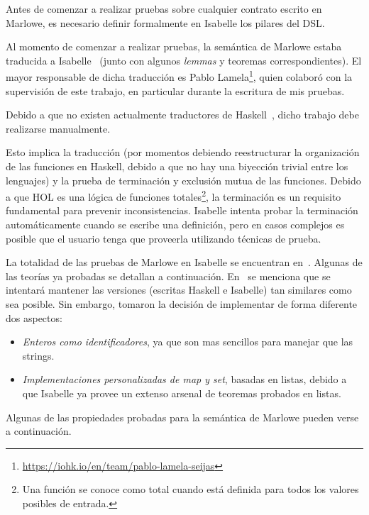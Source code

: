 \documentclass[12pt]{book}
\begin{document}
Antes de comenzar a realizar pruebas sobre cualquier contrato escrito en Marlowe, es necesario definir formalmente en Isabelle los pilares del DSL.\@

Al momento de comenzar a realizar pruebas, la semántica de Marlowe estaba traducida a Isabelle~\cite{implementing_financial_contracts_on_blockchain, efficient-static-analysis-marlowe-isabelle} (junto con algunos \textit{lemmas} y teoremas correspondientes). El mayor responsable de dicha traducción es Pablo Lamela\footnote{\url{https://iohk.io/en/team/pablo-lamela-seijas}}, quien colaboró con la supervisión de este trabajo, en particular durante la escritura de mis pruebas.

Debido a que no existen actualmente traductores de Haskell~\cite{translating-haskell-to-isabelle}, dicho trabajo debe realizarse manualmente. 

Esto implica la traducción (por momentos debiendo reestructurar la organización de las funciones en Haskell, debido a que no hay una biyección trivial entre los lenguajes) y la prueba de terminación y exclusión mutua de las funciones. Debido a que HOL es una lógica de funciones totales\footnote{Una función se conoce como total cuando está definida para todos los valores posibles de entrada.}, la terminación es un requisito fundamental para prevenir inconsistencias. Isabelle intenta probar la terminación automáticamente cuando se escribe una definición, pero en casos complejos es posible que el usuario tenga que proveerla utilizando técnicas de prueba.

La totalidad de las pruebas de Marlowe en Isabelle se encuentran en~\cite{marlowe-isabelle-repo}. Algunas de las teorías ya probadas se detallan a continuación. En~\cite{implementing_financial_contracts_on_blockchain} se menciona que se intentará mantener las versiones (escritas Haskell e Isabelle) tan similares como sea posible. Sin embargo, tomaron la decisión de implementar de forma diferente dos aspectos:

\begin{itemize}
    \item \textit{Enteros como identificadores}, ya que son mas sencillos para manejar que las strings.
    \item \textit{Implementaciones personalizadas de map y set}, basadas en listas, debido a que Isabelle ya provee un extenso arsenal de teoremas probados en listas.
\end{itemize}

Algunas de las propiedades probadas para la semántica de Marlowe pueden verse a continuación.
\end{document}
